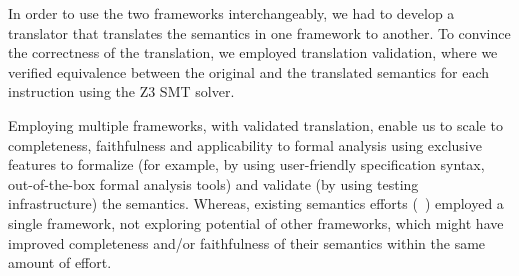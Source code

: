 {In order to use the two frameworks interchangeably, we had to develop a translator that translates the semantics in one framework to another. To convince the correctness of the translation, we employed translation validation, where we verified equivalence between the original and the translated semantics for each instruction using the Z3 SMT solver. 

Employing multiple frameworks, with validated translation, enable us to scale to completeness, faithfulness and applicability to formal analysis using exclusive features to formalize (for example, by using user-friendly specification syntax, out-of-the-box formal analysis tools) and validate (by using testing infrastructure) the semantics.
Whereas, existing semantics efforts (~\cite{Goel:FMCAD14,TSL:TOPLAS13,Leroy:2009,sail-x86,Heule2016a}) employed a single framework, not exploring potential of other frameworks, which might have improved completeness and/or faithfulness of their semantics within the same amount of effort.

}
